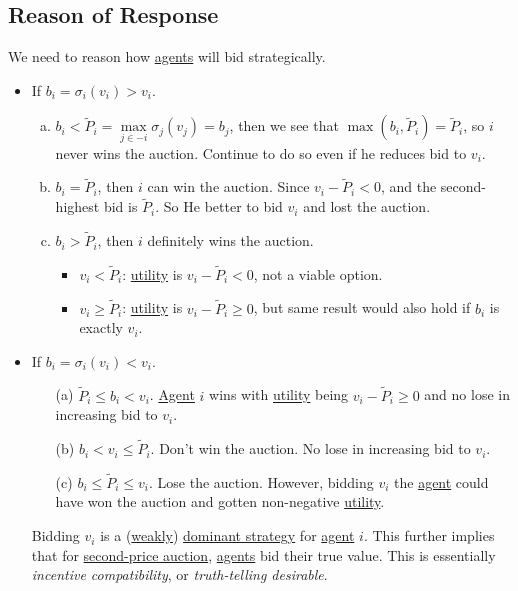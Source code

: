 \subsection{Reason of Response}
We need to reason how \hyperref[def:player]{agents} will bid strategically.
\begin{itemize}
	\item If \(b_{i} = \sigma_{i}(v_{i})>v_{i}\).
	      \begin{enumerate}[(a)]
		      \item \(b_{i}< \widetilde{P}_i = \max\limits_{j\in -i}\sigma_{j}(v_{j}) = b_{j}\), then we see that \(\max(b_{i}, \widetilde{P}_{i}) = \widetilde{P}_{i}\), so \(i\) never wins the auction. Continue to do so even if he reduces bid to \(v_{i}\).
		      \item \(b_{i} = \widetilde{P}_{i}\), then \(i\) can win the auction. Since \(v_{i} - \widetilde{P}_{i}<0\),  and the second-highest bid is \(\widetilde{P}_{i}\). So He better to bid \(v_{i}\) and lost the auction.
		      \item \(b_{i} > \widetilde{P}_{i}\), then \(i\) definitely wins the auction.
		            \begin{itemize}
			            \item \(v_{i}<\widetilde{P}_{i}\): \hyperref[def:reward]{utility}  is \(v_{i} - \widetilde{P}_{i}<0\), not a viable option.
			            \item \(v_{i}\geq \widetilde{P}_{i}\): \hyperref[def:reward]{utility}  is \(v_{i} - \widetilde{P}_{i}\geq 0\), but same result would also hold if \(b_{i}\) is exactly \(v_{i}\).
		            \end{itemize}
	      \end{enumerate}
	\item  If \(b_{i} = \sigma_{i}(v_{i})<v_{i}\).
	      \begin{enumerate}
		      \item[(a)] \(\widetilde{P}_{i}\leq b_{i}<v_{i}\). \hyperref[def:player]{Agent} \(i\) wins with \hyperref[def:reward]{utility}  being \(v_{i} - \widetilde{P}_{i}\geq 0\) and no lose in increasing bid to \(v_{i}\).
		      \item[(b)] \(b_{i}< v_{i}\leq \widetilde{P}_{i}\). Don't win the auction. No lose in increasing bid to \(v_{i}\).
		      \item[(c)] \(b_{i}\leq \widetilde{P}_{i}\leq v_{i}\). Lose the auction. However, bidding \(v_{i}\) the \hyperref[def:player]{agent} could have won the auction and gotten non-negative \hyperref[def:reward]{utility}.
	      \end{enumerate}
	      \begin{remark}\label{rmk:incentive-compatible}
		      Bidding \(v_i\) is a (\hyperref[def:weakly-dominant-strategy]{weakly}) \hyperref[def:dominant-strategy]{dominant strategy} for \hyperref[def:player]{agent} \(i\). This further implies that for \hyperref[eg:second-price-auction]{second-price auction}, \hyperref[def:player]{agents} bid their true value. This is essentially \emph{incentive compatibility}, or \emph{truth-telling desirable}.
	      \end{remark}
\end{itemize}

